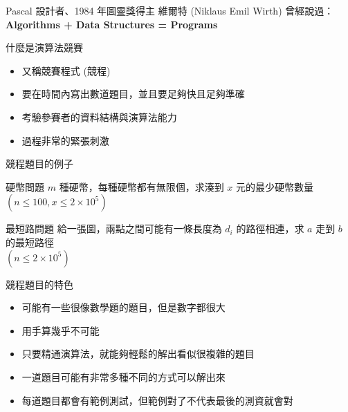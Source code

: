 \documentclass[aspectratio=169]{beamer}
\begin{document}
    \begin{frame}
    	\begin{center}
    		Pascal 設計者、1984 年圖靈獎得主 維爾特 (Niklaus Emil Wirth) 曾經說過：\\
	    	\textbf{Algorithms + Data Structures = Programs}
    	\end{center}
    	
    \end{frame}
    
    \begin{frame}{什麼是演算法競賽}
    	\begin{itemize}
    		\item<1-> 又稱競賽程式 (競程)
    		\item<2-> 要在時間內寫出數道題目，並且要足夠快且足夠準確
    		\item<3-> 考驗參賽者的資料結構與演算法能力
    		\item<4-> 過程非常的緊張刺激
    	\end{itemize}
    \end{frame}
    
    \begin{frame}{競程題目的例子}
    	\begin{block}{硬幣問題}
    		$m$ 種硬幣，每種硬幣都有無限個，求湊到 $x$ 元的最少硬幣數量\\
    		$(n \le 100, x \le 2 \times 10^5)$
    	\end{block}
    	
    	\begin{block}{最短路問題}
    		給一張圖，兩點之間可能有一條長度為 $d_i$ 的路徑相連，求 $a$ 走到 $b$ 的最短路徑\\
    		$(n \le 2 \times 10^5)$
    	\end{block}	
    \end{frame}
    
    
    \begin{frame}{競程題目的特色}
    	\begin{itemize}
    		\item<1-> 可能有一些很像數學題的題目，但是數字都很大
    		\item<2-> 用手算幾乎不可能
    		\item<3-> 只要精通演算法，就能夠輕鬆的解出看似很複雜的題目
    		\item<4-> 一道題目可能有非常多種不同的方式可以解出來
    		\item<5-> 每道題目都會有範例測試，但範例對了不代表最後的測資就會對
    	\end{itemize}
    \end{frame}
    
\end{document}
